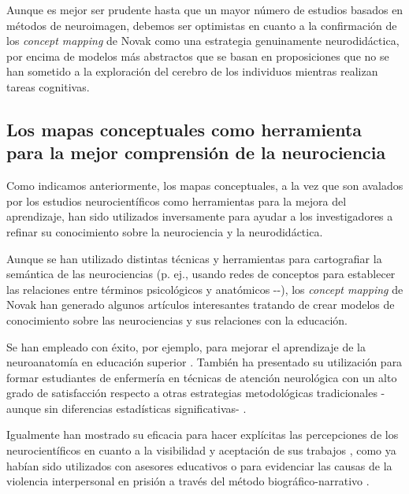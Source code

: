 \documentclass[spanish]{textolivre}
\begin{document}
Aunque es mejor ser prudente hasta que un mayor número de estudios basados en métodos de neuroimagen, debemos ser optimistas en cuanto a la confirmación de los \textit{concept mapping} de Novak como una estrategia genuinamente neurodidáctica, por encima de modelos más abstractos que se basan en proposiciones que no se han sometido a la exploración del cerebro de los individuos mientras realizan tareas cognitivas.


\subsection{Los mapas conceptuales como herramienta para la mejor comprensión de la neurociencia}\label{sec-conceptuales}

Como indicamos anteriormente, los mapas conceptuales, a la vez que son avalados por los estudios neurocientíficos como herramientas para la mejora del aprendizaje, han sido utilizados inversamente para ayudar a los investigadores a refinar su conocimiento sobre la neurociencia y la neurodidáctica.

Aunque se han utilizado distintas técnicas y herramientas para cartografiar la semántica de las neurociencias (p. ej., usando redes de conceptos para establecer las relaciones entre términos psicológicos y anatómicos -\cite{beam_mapping_2014}-),%
los \textit{concept mapping} de Novak han generado algunos artículos interesantes tratando de crear modelos de conocimiento sobre las neurociencias y sus relaciones con la educación.

Se han empleado con éxito, por ejemplo, para mejorar el aprendizaje de la neuroanatomía en educación superior \cite{uribe2010mapas}. %
También ha presentado su utilización para formar estudiantes de enfermería en técnicas de atención neurológica con un alto grado de satisfacción respecto a otras estrategias metodológicas tradicionales -aunque sin diferencias estadísticas significativas- \cite{hsu2016randomized}. %

Igualmente han mostrado su eficacia para hacer explícitas las percepciones de los neurocientíficos en cuanto a la visibilidad y aceptación de sus trabajos \cite{koh2016mapping}, %
como ya habían sido utilizados con asesores educativos o para evidenciar las causas de la violencia interpersonal en prisión \cite{puerta2016} %
a través del método biográfico-narrativo \cite{khaled2017caracterizacion,khaled2021andragogo}.
\end{document}
